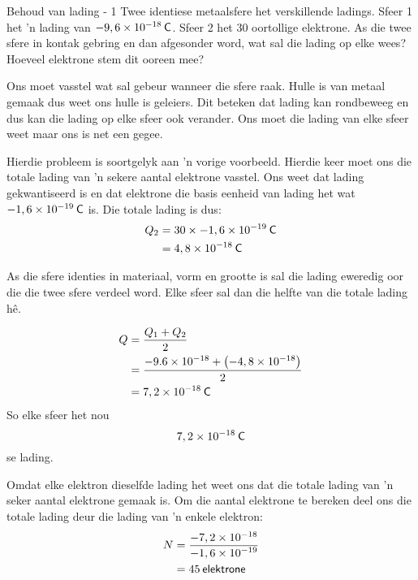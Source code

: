 \begin{wex}{Behoud van lading - 1}
{
Twee identiese metaalsfere het verskillende ladings. Sfeer 1 het 'n lading van $-9,6\ensuremath{\times}{10}^{-18}\phantom{\rule{2pt}{0ex}}\mathsf{C}$. Sfeer 2 het 30 oortollige elektrone. As die twee sfere in kontak gebring en dan afgesonder word, wat sal die lading op elke wees? Hoeveel elektrone stem dit ooreen mee?
}
{
Ons moet vasstel wat sal gebeur wanneer die sfere raak. Hulle is van metaal gemaak dus weet ons hulle is geleiers. Dit beteken dat lading kan rondbeweeg en dus kan die lading op elke sfeer ook verander. Ons moet die lading van elke sfeer weet maar ons is net een gegee.


Hierdie probleem is soortgelyk aan 'n vorige voorbeeld. Hierdie keer moet ons die totale lading van 'n sekere aantal elektrone vasstel. Ons weet dat lading gekwantiseerd is en dat elektrone die basis eenheid van lading het wat  $-1,6\ensuremath{\times}{10}^{-19}\phantom{\rule{2pt}{0ex}}\mathsf{C}$ is. Die totale lading is dus:
    \begin{align*}
    {Q}_{2}&=30\ensuremath{\times}-1,6\ensuremath{\times}{10}^{-19}\phantom{\rule{2pt}{0ex}}\mathsf{C}\\ 
\phantom{x}&=4,8\ensuremath{\times}{10}^{-18}\phantom{\rule{2pt}{0ex}}\mathsf{C}
      \end{align*}



As die sfere identies in materiaal, vorm en grootte is sal die lading eweredig oor die die twee sfere verdeel word. Elke sfeer sal dan die helfte van die totale lading h\^e. 
    
\begin{align*}
Q  &=\frac{{Q}_{1}+{Q}_{2}}{2}\\ \phantom{x}&=\frac{-9.6\ensuremath{\times}{10}^{-18}+\left(-4,8\ensuremath{\times}{10}^{-18}\right)}{2}\\ 
    &=7,2\ensuremath{\times}{10}^{-18}\phantom{\rule{2pt}{0ex}}\mathsf{C}
\end{align*}
 So elke sfeer het nou
\begin{equation*}
    7,2\ensuremath{\times}{10}^{-18}\phantom{\rule{2pt}{0ex}}\mathsf{C}
\end{equation*}
     se lading. \par


Omdat elke elektron dieselfde lading het weet ons dat die totale lading van 'n seker aantal elektrone gemaak is. Om die aantal elektrone te bereken deel ons die totale lading deur die lading van 'n enkele elektron:
\begin{align*}
     N &=\frac{-7,2\ensuremath{\times}{10}^{-18}}{-1,6\ensuremath{\times}{10}^{-19}}\\ 
\phantom{x}&=45\phantom{\rule{2pt}{0ex}}\mathsf{elektrone} 
    \end{align*}
}\end{wex}





